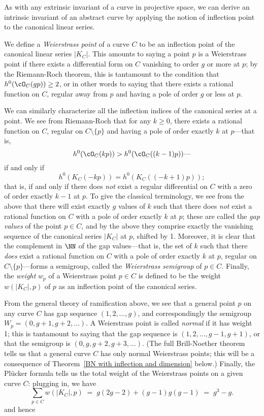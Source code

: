As with any extrinsic invariant of a curve in projective space, we can derive an intrinsic invariant of an abstract curve by applying the notion of inflection point to the canonical linear series. 

We define a \emph{Weierstrass point} of a curve $C$ to be an inflection point of the canonical linear series $|K_C|$. This amounts to saying a point $p$ is a Weierstrass point if there exists a  differential form on $C$ vanishing to order $g$ or more at $p$; by the Riemann-Roch theorem, this is tantamount to the condition that $h^0(\cO_C(gp)) \geq 2$, or in other words to saying that there exists a rational function on $C$, regular away from $p$ and having a pole of order $g$ or less at $p$.

We can similarly characterize all the inflection indices of the canonical series at a point. We see from Riemann-Roch that for any $k \geq 0$, there exists a rational function on $C$, regular on $C \setminus \{p\}$ and having a pole of order exactly $k$ at $p$---that is,
$$
h^0(\cO_C(kp)) > h^0(\cO_C((k-1)p))\text{---}
$$
if and only if 
$$
h^0(K_C(-kp)) = h^0(K_C((-k+1)p)); 
$$
that is, if and only if there does \emph{not} exist a regular differential on $C$ with a zero of order exactly $k-1$ at $p$. To give the classical terminology, we see from the above that there will exist exactly $g$ values of $k$ such that there does \emph{not} exist a rational function on $C$ with a pole of order exactly $k$ at $p$; these are called the \emph{gap values} of the point $p \in C$, and by the above they comprise exactly the vanishing sequence of the canonical series $|K_C|$ at $p$, shifted by 1. Moreover, it is clear that the complement in $\NN$ of the gap values---that is, the set of $k$ such that there \emph{does} exist a rational function on $C$ with a pole of order exactly $k$ at $p$, regular on $C \setminus \{p\}$---forms a semigroup, called the \emph{Weierstrass semigroup} of $p \in C$. Finally, the \emph{weight} $w_p$ of a Weierstrass point $p \in C$  is defined to be the weight $w(|K_C|,p)$ of $p$ as an inflection point of the canonical series.

From the general theory of ramification above, we see that a general point $p$ on any curve $C$ has gap sequence $(1,2,\dots,g)$, and correspondingly the semigroup $W_p = (0, g+1, g+2, \dots)$. A Weierstrass point is called \emph{normal} if it has weight 1; this is tantamount to saying that the gap sequence is $(1,2,\dots,g-1,g+1)$, or that the semigroup is $(0, g, g+2, g+3, \dots)$. (The full Brill-Noether theorem tells us that a general curve $C$ has only normal Weierstrass points; this will be a consequence of Theorem~\ref{BN with inflection and dimension} below.) Finally, the Pl\"ucker formula tells us  the total weight of the Weierstrass points on a given curve $C$: plugging in, we have
$$
\sum_{p \in C} w(|K_C|, p) \; = \; g(2g-2) + (g-1)g(g-1) \; =\;  g^3-g.
$$ 
and hence

